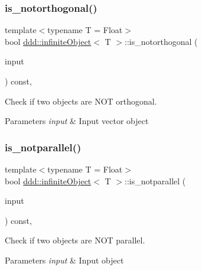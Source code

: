 \subsubsection{\texorpdfstring{is\+\_\+notorthogonal()}{is\_notorthogonal()}}
{\footnotesize\ttfamily template$<$typename T = Float$>$ \\
bool \hyperlink{classddd_1_1infinite_object}{ddd\+::infinite\+Object}$<$ T $>$\+::is\+\_\+notorthogonal (\begin{DoxyParamCaption}\item[{const \hyperlink{classddd_1_1infinite_object}{infinite\+Object}$<$ T $>$ \&}]{input }\end{DoxyParamCaption}) const\hspace{0.3cm}{\ttfamily [inline]}, {\ttfamily [inherited]}}



Check if two objects are N\+OT orthogonal. 


\begin{DoxyParams}{Parameters}
{\em input} & Input vector object \\
\hline
\end{DoxyParams}
\mbox{\label{classddd_1_1infinite_object_ad4f312a6d767c5825632d8915a9f7dbc}} 
\subsubsection{\texorpdfstring{is\+\_\+notparallel()}{is\_notparallel()}}
{\footnotesize\ttfamily template$<$typename T = Float$>$ \\
bool \hyperlink{classddd_1_1infinite_object}{ddd\+::infinite\+Object}$<$ T $>$\+::is\+\_\+notparallel (\begin{DoxyParamCaption}\item[{const \hyperlink{classddd_1_1infinite_object}{infinite\+Object}$<$ T $>$ \&}]{input }\end{DoxyParamCaption}) const\hspace{0.3cm}{\ttfamily [inline]}, {\ttfamily [inherited]}}



Check if two objects are N\+OT parallel. 


\begin{DoxyParams}{Parameters}
{\em input} & Input object \\
\hline
\end{DoxyParams}
\mbox{\label{classddd_1_1infinite_object_a634f0db3a5447756901c43f8f3d20a8a}} 
